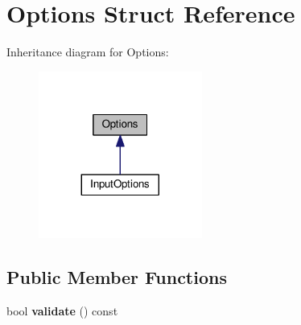 \hypertarget{structOptions}{}\section{Options Struct Reference}
\label{structOptions}


Inheritance diagram for Options\+:\nopagebreak
\begin{figure}[H]
\begin{center}
\leavevmode
\includegraphics[width=152pt]{structOptions__inherit__graph}
\end{center}
\end{figure}
\subsection*{Public Member Functions}
\begin{DoxyCompactItemize}
\item 
bool {\bfseries validate} () const \hypertarget{structOptions_a0a376f3c34edd6b86db2ec91f2a94465}{}\label{structOptions_a0a376f3c34edd6b86db2ec91f2a94465}

\end{DoxyCompactItemize}
